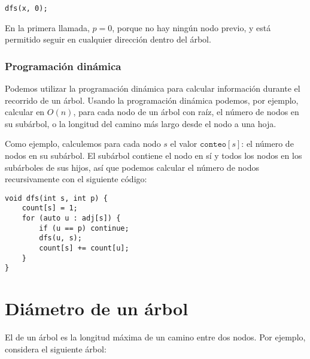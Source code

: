 \begin{lstlisting}
dfs(x, 0);
\end{lstlisting}

En la primera llamada, $p=0$, porque no hay ningún nodo previo,
y está permitido seguir en cualquier dirección dentro del árbol.

\subsubsection{Programación dinámica}

Podemos utilizar la programación dinámica para calcular información
durante el recorrido de un árbol. Usando la programación dinámica
podemos, por ejemplo, calcular en $O(n)$, para cada nodo de un árbol
con raíz, el número de nodos en su subárbol, o la longitud del
camino más largo desde el nodo a una hoja.

Como ejemplo, calculemos para cada nodo $s$ el valor $\texttt{conteo}[s]$:
el número de nodos en su subárbol. El subárbol contiene el nodo en sí
y todos los nodos en los subárboles de sus hijos, así que podemos
calcular el número de nodos recursivamente con el siguiente código:

\begin{lstlisting}
void dfs(int s, int p) {
    count[s] = 1;
    for (auto u : adj[s]) {
        if (u == p) continue;
        dfs(u, s);
        count[s] += count[u];
    }
}
\end{lstlisting}

\section{Diámetro de un árbol}


El  de un árbol es la longitud máxima de un
camino entre dos nodos. Por ejemplo, considera el siguiente árbol:
\begin{center}
\end{center}

